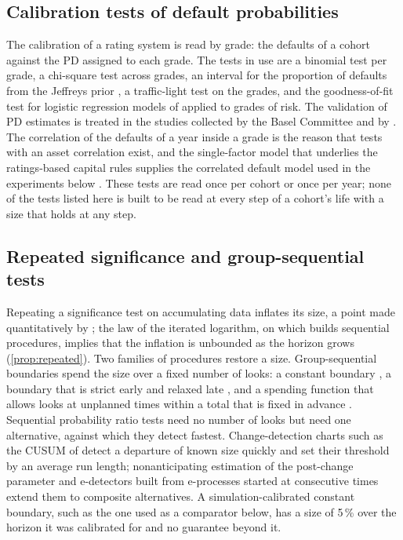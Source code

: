\subsection{Calibration tests of default probabilities}
\label{sec:rw-pd}

The calibration of a rating system is read by grade: the defaults of a cohort against the PD assigned to each grade. The tests in use are a binomial test per grade, a chi-square
test across grades, an interval for the proportion of defaults from the Jeffreys prior \citep{jeffreys1946}, a traffic-light test on the grades, and the goodness-of-fit test for logistic regression models of
\citet{hosmer1980} applied to grades of risk. The validation of PD estimates is treated in the studies collected by the Basel Committee \citep{bcbs2005} and by \citet{tasche2008}. The correlation of the defaults of a
year inside a grade is the reason that tests with an asset correlation exist, and the single-factor model that underlies the ratings-based capital rules supplies the correlated default model used in the experiments below
\citep{gordy2003}. These tests are read once per cohort or once per year; none of the tests listed here is built to be read at every step of a cohort's life with a size that holds at any step.

\subsection{Repeated significance and group-sequential tests}
\label{sec:rw-sequential}

Repeating a significance test on accumulating data inflates its size, a point made quantitatively by \citet{armitage1969}; the law of the iterated logarithm, on which \citet{robbins1970} builds sequential
procedures, implies that the inflation is unbounded as the horizon grows (\cref{prop:repeated}). Two families of procedures restore a size. Group-sequential boundaries spend the size over a fixed number of looks:
a constant boundary \citep{pocock1977}, a boundary that is strict early and relaxed late \citep{obrien1979}, and a spending function that allows looks at unplanned times within a total
that is fixed in advance \citep{lan1983}. Sequential probability ratio tests \citep{wald1945} need no number of looks but need one alternative, against which they detect fastest. Change-detection
charts such as the CUSUM of \citet{page1954} detect a departure of known size quickly and set their threshold by an average run length; nonanticipating estimation of the post-change parameter
\citep{lorden2005} and e-detectors built from e-processes started at consecutive times \citep{shin2023} extend them to composite alternatives. A simulation-calibrated constant boundary, such as the one used as a comparator below, has a size of
5\,\% over the horizon it was calibrated for and no guarantee beyond it.

